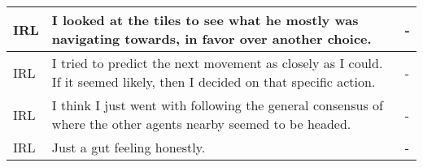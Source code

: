 \documentclass{article}
\begin{document}
\begin{longtable}{ | m{0.6in} | m{5in}| m{0.6in} | }
IRL & I looked at the tiles to see what he mostly was navigating towards, in favor over another choice. & - \\ \hline
IRL & I tried to predict the next movement as closely as I could. If it seemed likely, then I decided on that specific action. & - \\ \hline
IRL & I think I just went with following the general consensus of where the other agents nearby seemed to be headed. & - \\ \hline
IRL & Just a gut feeling honestly. & - \\ \hline
 
\end{longtable}
\end{document}
